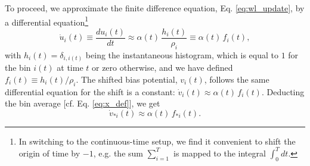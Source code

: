 \documentclass[reprint, superscriptaddress, floatfix]{revtex4-1}
\begin{document}
To proceed, we
approximate the finite difference equation, Eq. \eqref{eq:wl_update},
by a differential equation\footnote{In
  switching to the continuous-time setup,
  we find it convenient to shift the origin of time by $-1$,
  e.g. the sum $\sum_{i=1}^T$ is mapped to the integral $\int_0^T dt$.}
%
\begin{equation}
  \dot u_i(t)
  \equiv
  \frac{ d u_i(t) } { dt }
  \approx
  \alpha(t) \, \frac{ h_i(t) } { \rho_i }
  \equiv
  \alpha(t) \, f_i(t)
  ,
  \label{eq:ut_diffeq}
\end{equation}
%
with
%
$h_i(t) = \delta_{i, i(t)}$
%
being the instantaneous histogram,
which is equal to $1$
for the bin $i(t)$ at time $t$
or zero otherwise,
and we have defined
$f_i(t) \equiv h_i(t) /\rho_i$.
%
The shifted bias potential, $v_i(t)$,
follows the same differential equation
for the shift is a constant:
$\dot v_i(t) \approx \alpha(t) \, f_i(t)$.
%
Deducting the bin average [cf. Eq. \eqref{eq:x_def}],
we get
%
\begin{equation}
  \dot v_{*i}(t)
  \approx
  \alpha(t) \, f_{*i}(t)
  .
  \label{eq:vt_diffeq}
\end{equation}
\end{document}
